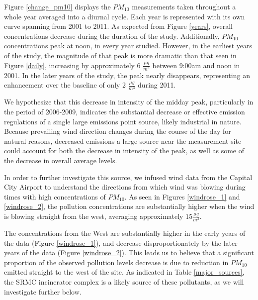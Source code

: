 \documentclass[11pt,journal]{IEEEtran}
\begin{document}
Figure \ref{change_pm10} displays the $PM_{10}$ measurements taken throughout a whole year averaged into a diurnal cycle. Each year is represented with its own curve spanning from 2001 to 2011. As expected from Figure \ref{years}, overall concentrations decrease during the duration of the study. Additionally, $PM_{10}$ concentrations peak at noon, in every year studied. However, in the earliest years of the study, the magnitude of that peak is more dramatic than that seen in Figure \ref{daily}, increasing by approximately 6 $\frac{\mu g}{m^3}$ between 9:00am and noon in 2001. In the later years of the study, the peak nearly disappears, representing an enhancement over the baseline of only 2 $\frac{\mu g}{m^3}$ during 2011. 

We hypothesize that this decrease in intensity of the midday peak, particularly in the period of 2006-2009, indicates the substantial decrease or effective emission regulations of a single large emissions point source, likely industrial in nature. Because prevailing wind direction changes during the course of the day for natural reasons, decreased emissions a large source near the measurement site could account for both the decrease in intensity of the peak, as well as some of the decrease in overall average levels. 




In order to further investigate this source, we infused wind data from the Capital City Airport to understand the directions from which wind was blowing during times with high concentrations of $PM_{10}$. As seen in Figures \ref{windrose_1} and \ref{windrose_2}, the pollution concentrations are substantially higher when the wind is blowing straight from the west, averaging approximately $15 \frac{\mu g}{m^3}$. 

The concentrations from the West are substantially higher in the early years of the data (Figure \ref{windrose_1}), and decrease disproportionately by the later  years of the data (Figure \ref{windrose_2}). This leads us to believe that a significant proportion of the observed pollution levels decrease is due to reduction in $PM_{10}$ emitted straight to the west of the site. As indicated in Table \ref{major_sources}, the SRMC incinerator complex is a likely source of these pollutants, as we will investigate further below.
\end{document}
